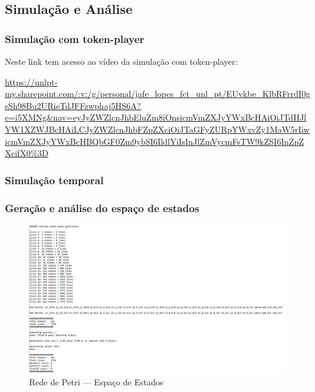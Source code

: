 \subsection{Simulação e Análise}

\subsubsection{Simulação com token-player}


Neste link tem acesso ao vídeo da simulação com token-player: 

\hspace{1em}

\url{https://unlpt-my.sharepoint.com/:v:/g/personal/jafe_lopes_fct_unl_pt/EUvkbe_KlbRFrrdI0gsSh98Bu2URieTdJFFzwphaj5HS6A?e=i5XMNg&nav=eyJyZWZlcnJhbEluZm8iOnsicmVmZXJyYWxBcHAiOiJTdHJlYW1XZWJBcHAiLCJyZWZlcnJhbFZpZXciOiJTaGFyZURpYWxvZy1MaW5rIiwicmVmZXJyYWxBcHBQbGF0Zm9ybSI6IldlYiIsInJlZmVycmFsTW9kZSI6InZpZXcifX0%3D}


\subsubsection{Simulação temporal}

\subsubsection{Geração e análise do espaço de estados}

\begin{figure}[H]
    \centering
    \includegraphics[width=1\textwidth]{img/petri_statespace.png}
    \caption{Rede de Petri --- Espaço de Estados}\label{fig:petri_statespace}
\end{figure}